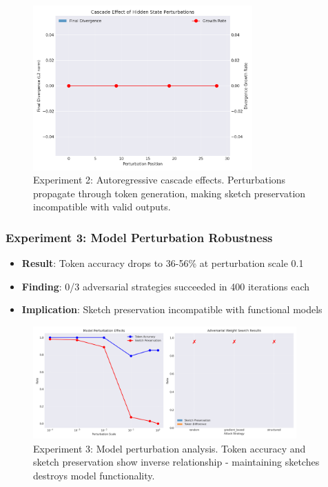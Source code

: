 \documentclass[11pt,a4paper]{article}
\begin{document}
\begin{figure}[ht]
\centering
\includegraphics[width=0.75\textwidth]{experiment_2_cascade_effect.png}
\caption{Experiment 2: Autoregressive cascade effects. Perturbations propagate through token generation, making sketch preservation incompatible with valid outputs.}
\label{fig:exp2b}
\end{figure}

\subsubsection{Experiment 3: Model Perturbation Robustness}
\begin{itemize}
    \item \textbf{Result}: Token accuracy drops to 36-56\% at perturbation scale 0.1
    \item \textbf{Finding}: 0/3 adversarial strategies succeeded in 400 iterations each
    \item \textbf{Implication}: Sketch preservation incompatible with functional models
\end{itemize}

\begin{figure}[ht]
\centering
\includegraphics[width=0.9\textwidth]{experiment_3_perturbation_analysis.png}
\caption{Experiment 3: Model perturbation analysis. Token accuracy and sketch preservation show inverse relationship - maintaining sketches destroys model functionality.}
\label{fig:exp3}
\end{figure}
\end{document}
